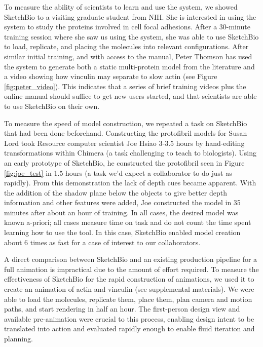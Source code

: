 \documentclass[twocolumn]{bmcart}%
\begin{document}
To measure the ability of scientists to learn and use the system, we showed SketchBio to a visiting graduate student from NIH.  She is interested in using the system to study the proteins involved in cell focal adhesions.  After a 30-minute training session where she saw us using the system, she was able to use SketchBio to load, replicate, and placing the molecules into relevant configurations.  After similar initial training, and with access to the manual, Peter Thomson has used the system to generate both a static multi-protein model from the literature and a video showing how vinculin may separate to slow actin (see Figure \ref{fig:peter_video}).   This indicates that a series of brief training videos plus the online manual should suffice to get new users started, and that scientists are able to use SketchBio on their own.

To measure the speed of model construction, we repeated a task on SketchBio that had been done beforehand.  Constructing the protofibril models for Susan Lord took Resource computer scientist Joe Hsiao 3-3.5 hours by hand-editing transformations within Chimera (a task challenging to teach to biologists).  Using an early prototype of SketchBio, he constructed the protofibril seen in Figure \ref{fig:joe_test} in 1.5 hours (a task we'd expect a collaborator to do just as rapidly).  From this demonstration the lack of depth cues became apparent.  With the addition of the shadow plane below the objects to give better depth information and other features were added, Joe constructed the model in 35 minutes after about an hour of training.  In all cases, the desired model was known a-priori; all cases measure time on task and do not count the time spent learning how to use the tool.  In this case, SketchBio enabled model creation about 6 times as fast for a case of interest to our collaborators.

A direct comparison between SketchBio and an existing production pipeline for a full animation is impractical due to the amount of effort required.  To measure the effectiveness of SketchBio for the rapid construction of animations, we used it to create an animation of actin and vinculin (see supplemental materials).  We were able to load the molecules, replicate them, place them, plan camera and motion paths, and start rendering in half an hour.  The first-person design view and available pre-animation were crucial to this process, enabling design intent to be translated into action and evaluated rapidly enough to enable fluid iteration and planning.
\end{document}
